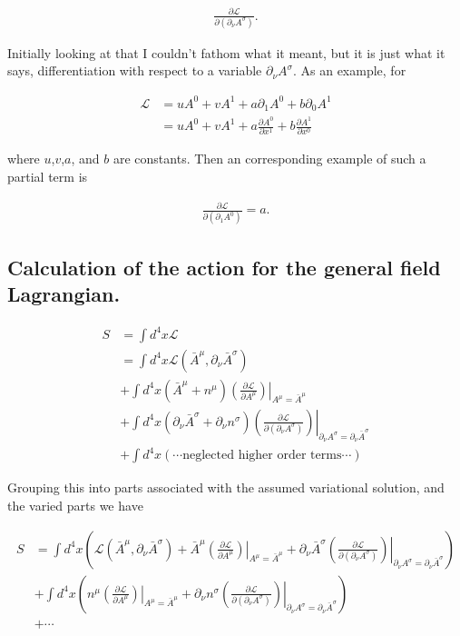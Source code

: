\documentclass{article}
\newcommand{\LL}[0]{\mathcal{L}}
\newcommand{\PD}[2]{\frac{\partial {#2}}{\partial {#1}}}
\newcommand{\barA}[0]{\bar{A}}
\begin{document}
\begin{align*}
\PD{(\partial_\nu A^\sigma)}{\LL}.
\end{align*}

Initially looking at that I couldn't fathom what it meant, but it is just what it says, 
differentiation with respect to a variable $\partial_\nu A^\sigma$.  As an example, for

\begin{align*}
\LL 
&= u A^0 + v A^1 + a \partial_1 A^0 + b \partial_0 A^1 \\
&= u A^0 + v A^1 + a \PD{x^1}{A^0} + b \PD{x^0}{A^1}
\end{align*}

where $u$,$v$,$a$, and $b$ are constants.  Then an corresponding example of such a partial term is

\begin{align*}
\PD{(\partial_1 A^0)}{\LL} = a.
\end{align*}

\subsection{ Calculation of the action for the general field Lagrangian. }

\begin{align*}
S &= \int d^4 x \LL \\
&= \int d^4 x \LL(\barA^\mu, \partial_\nu \barA^\sigma ) \\
&+ \int d^4 x (\barA^\mu + n^\mu) \left( \left. \PD{A^\mu}{\LL} \right) \right\vert_{A^\mu = \barA^\mu} \\
&+ \int d^4 x (\partial_\nu \barA^\sigma + \partial_\nu n^\sigma) \left( \left. \PD{(\partial_\nu A^\sigma)}{\LL} \right) \right\vert_{\partial_\nu A^\sigma = \partial_\nu \barA^\sigma} \\
&+ \int d^4 x (\cdots \text{neglected higher order terms} \cdots )
\end{align*}

Grouping this into parts associated with the assumed variational solution, and the varied parts we have

\begin{align*}
S &= \int d^4 x 
\left(
\LL(\barA^\mu, \partial_\nu \barA^\sigma ) + \barA^\mu \left. \left( \PD{A^\mu}{\LL} \right) \right\vert_{A^\mu = \barA^\mu} 
+ \partial_\nu \barA^\sigma \left. \left( \PD{(\partial_\nu A^\sigma)}{\LL} \right) \right\vert_{\partial_\nu A^\sigma = \partial_\nu \barA^\sigma} 
\right) \\
&+ \int d^4 x 
\left(
n^\mu \left. \left( \PD{A^\mu}{\LL} \right) \right\vert_{A^\mu = \barA^\mu} 
+\partial_\nu n^\sigma \left. \left( \PD{(\partial_\nu A^\sigma)}{\LL} \right) \right\vert_{\partial_\nu A^\sigma = \partial_\nu \barA^\sigma}
\right) \\
&+ \cdots
\end{align*}
\end{document}
